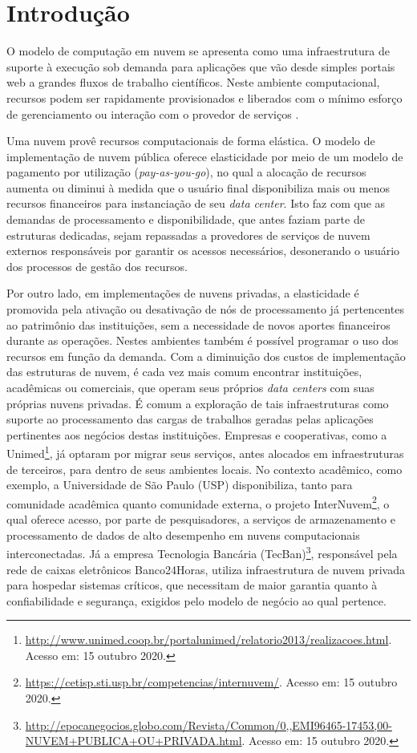 \documentclass[tese,capa]{texufpel}
\begin{document}
\tableofcontents

\chapter{Introdução}

O modelo de computação em nuvem se apresenta como uma infraestrutura de suporte à execução sob demanda para aplicações que vão desde simples portais web a grandes fluxos de trabalho científicos. Neste ambiente computacional, recursos podem ser rapidamente provisionados e liberados com o mínimo esforço de gerenciamento ou interação com o provedor de serviços \cite{mell_nist_2011}.

Uma nuvem provê recursos computacionais de forma elástica. O modelo de implementação de nuvem pública oferece elasticidade por meio de um modelo de pagamento por utilização (\textit{pay-as-you-go}), no qual a alocação de recursos aumenta ou diminui à medida que o usuário final disponibiliza mais ou menos recursos financeiros para instanciação de seu \emph{data center}. Isto faz com que as demandas de processamento e disponibilidade, que antes faziam parte de estruturas dedicadas, sejam repassadas a provedores de serviços de nuvem externos responsáveis por garantir os acessos necessários, desonerando o usuário dos processos de gestão dos recursos.

Por outro lado, em implementações de nuvens privadas, a elasticidade é promovida pela  ativação ou desativação de nós de processamento já pertencentes ao patrimônio das instituições, sem a necessidade de novos aportes financeiros durante as operações. Nestes ambientes também é possível programar o uso dos recursos em função da demanda. Com a diminuição dos custos de implementação das estruturas de nuvem, é cada vez mais comum encontrar instituições, acadêmicas ou comerciais, que operam seus próprios \emph{data centers} com suas próprias nuvens privadas. É comum a exploração de tais infraestruturas como suporte ao processamento das cargas de trabalhos geradas pelas aplicações pertinentes aos negócios destas instituições. Empresas e cooperativas, como a Unimed\footnote{\url{http://www.unimed.coop.br/portalunimed/relatorio2013/realizacoes.html}. Acesso em: 15 outubro 2020.}, já optaram por migrar seus serviços, antes alocados em infraestruturas de terceiros, para dentro de seus ambientes locais. No contexto acadêmico, como exemplo, a Universidade de São Paulo (USP) disponibiliza, tanto para comunidade acadêmica quanto comunidade externa, o projeto InterNuvem\footnote{\url{https://cetisp.sti.usp.br/competencias/internuvem/}. Acesso em: 15 outubro 2020.}, o qual oferece acesso, por parte de pesquisadores, a serviços de armazenamento e processamento de dados de alto desempenho em nuvens computacionais interconectadas. Já a empresa Tecnologia Bancária (TecBan)\footnote{\url{http://epocanegocios.globo.com/Revista/Common/0,,EMI96465-17453,00-NUVEM+PUBLICA+OU+PRIVADA.html}. Acesso em: 15 outubro 2020.}, responsável pela rede de caixas eletrônicos Banco24Horas, utiliza infraestrutura de nuvem privada para hospedar sistemas críticos, que necessitam de maior garantia quanto à confiabilidade e segurança, exigidos pelo modelo de negócio ao qual pertence.
\end{document}
